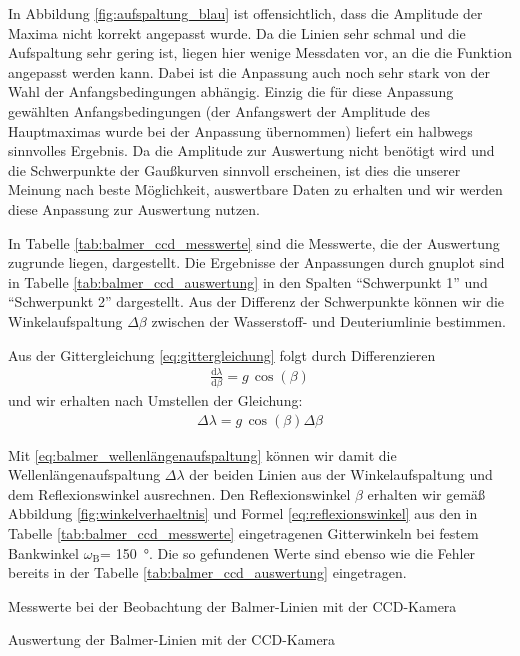\documentclass[11pt, a4paper]{article}
\numberwithin{equation}{section}
\begin{document}
In Abbildung \ref{fig:aufspaltung_blau} ist offensichtlich, dass die Amplitude der Maxima nicht korrekt angepasst wurde.
Da die Linien sehr schmal und die Aufspaltung sehr gering ist, liegen hier wenige Messdaten vor, an die die Funktion angepasst werden kann.
Dabei ist die Anpassung auch noch sehr stark von der Wahl der Anfangsbedingungen abhängig.
Einzig die für diese Anpassung gewählten Anfangsbedingungen (der Anfangswert der Amplitude des Hauptmaximas wurde bei der Anpassung übernommen) liefert ein halbwegs sinnvolles Ergebnis.
Da die Amplitude zur Auswertung nicht benötigt wird und die Schwerpunkte der Gaußkurven sinnvoll erscheinen, ist dies die unserer Meinung nach beste Möglichkeit, auswertbare Daten zu erhalten und wir werden diese Anpassung zur Auswertung nutzen.

In Tabelle \ref{tab:balmer_ccd_messwerte} sind die Messwerte, die der Auswertung zugrunde liegen, dargestellt.
Die Ergebnisse der Anpassungen durch gnuplot sind in Tabelle \ref{tab:balmer_ccd_auswertung} in den Spalten "`Schwerpunkt 1"' und "`Schwerpunkt 2"' dargestellt.
Aus der Differenz der Schwerpunkte können wir die Winkelaufspaltung $\Delta\beta$ zwischen der Wasserstoff- und Deuteriumlinie bestimmen.

Aus der Gittergleichung \eqref{eq:gittergleichung} folgt durch Differenzieren
\begin{align*}
\frac{\text{d}\lambda}{\text{d}\beta}=g\,\cos(\beta)
\end{align*}
und wir erhalten nach Umstellen der Gleichung:
\begin{align}
\Delta\lambda=g\,\cos(\beta)\Delta\beta
\label{eq:balmer_wellenlängenaufspaltung}
\end{align}

Mit \eqref{eq:balmer_wellenlängenaufspaltung} können wir damit die Wellenlängenaufspaltung $\Delta\lambda$ der beiden Linien aus der Winkelaufspaltung und dem Reflexionswinkel ausrechnen.
Den Reflexionswinkel $\beta$ erhalten wir gemäß Abbildung \ref{fig:winkelverhaeltnis} und Formel  \eqref{eq:reflexionswinkel} aus den in Tabelle \ref{tab:balmer_ccd_messwerte} eingetragenen Gitterwinkeln bei festem Bankwinkel $\omega_\text{B}$= \SI{150}{\degree}.
Die so gefundenen Werte sind ebenso wie die Fehler bereits in der Tabelle \ref{tab:balmer_ccd_auswertung} eingetragen.

\begin{table}
\centering

\caption{Messwerte bei der Beobachtung der Balmer-Linien mit der CCD-Kamera}
\label{tab:balmer_ccd_messwerte}
\end{table}
\begin{table}
\centering
\resizebox{\columnwidth}{!}{%
}
\caption{Auswertung der Balmer-Linien mit der CCD-Kamera}
\label{tab:balmer_ccd_auswertung}
\end{table}
\clearpage
\end{document}
